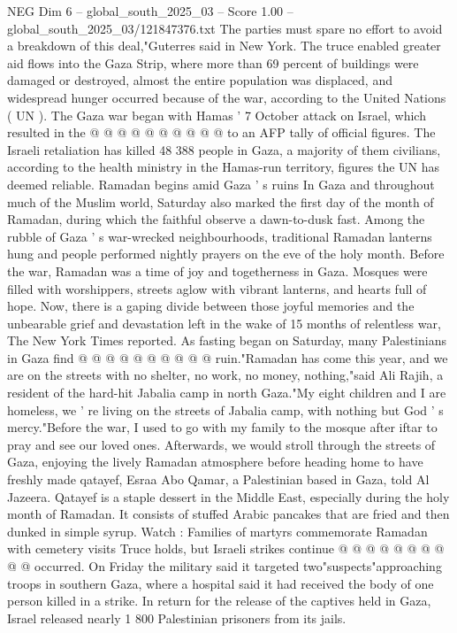 \begin{textsample}{NEG Dim 6 – global\_south\_2025\_03 – Score 1.00 – global\_south\_2025\_03/121847376.txt}
The parties must spare no effort to avoid a breakdown of this deal,"Guterres said in New York.
The truce enabled greater aid flows into the Gaza Strip, where more than 69 percent of buildings were damaged or destroyed, almost the entire population was displaced, and widespread hunger occurred because of the war, according to the United Nations ( UN ).
The Gaza war began with Hamas ' 7 October attack on Israel, which resulted in the @ @ @ @ @ @ @ @ @ @ to an AFP tally of official figures.
The Israeli retaliation has killed 48 388 people in Gaza, a majority of them civilians, according to the health ministry in the Hamas-run territory, figures the UN has deemed reliable.
Ramadan begins amid Gaza ' s ruins In Gaza and throughout much of the Muslim world, Saturday also marked the first day of the month of Ramadan, during which the faithful observe a dawn-to-dusk fast.
Among the rubble of Gaza ' s war-wrecked neighbourhoods, traditional Ramadan lanterns hung and people performed nightly prayers on the eve of the holy month.
Before the war, Ramadan was a time of joy and togetherness in Gaza.
Mosques were filled with worshippers, streets aglow with vibrant lanterns, and hearts full of hope.
Now, there is a gaping divide between those joyful memories and the unbearable grief and devastation left in the wake of 15 months of relentless war, The New York Times reported.
As fasting began on Saturday, many Palestinians in Gaza find @ @ @ @ @ @ @ @ @ @ ruin."Ramadan has come this year, and we are on the streets with no shelter, no work, no money, nothing,"said Ali Rajih, a resident of the hard-hit Jabalia camp in north Gaza."My eight children and I are homeless, we ' re living on the streets of Jabalia camp, with nothing but God ' s mercy."Before the war, I used to go with my family to the mosque after iftar to pray and see our loved ones.
Afterwards, we would stroll through the streets of Gaza, enjoying the lively Ramadan atmosphere before heading home to have freshly made qatayef, Esraa Abo Qamar, a Palestinian based in Gaza, told Al Jazeera.
Qatayef is a staple dessert in the Middle East, especially during the holy month of Ramadan.
It consists of stuffed Arabic pancakes that are fried and then dunked in simple syrup.
Watch : Families of martyrs commemorate Ramadan with cemetery visits Truce holds, but Israeli strikes continue @ @ @ @ @ @ @ @ @ @ occurred.
On Friday the military said it targeted two"suspects"approaching troops in southern Gaza, where a hospital said it had received the body of one person killed in a strike.
In return for the release of the captives held in Gaza, Israel released nearly 1 800 Palestinian prisoners from its jails.

\end{textsample}
